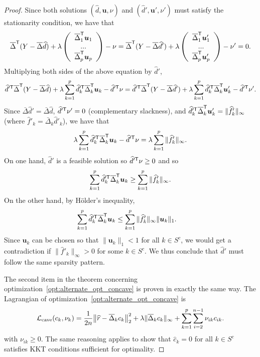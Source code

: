 \begin{proof}
Since both solutions $(\hat{d}, \mathbf{u}, \nu)$ and $(\hat{d}',
\mathbf{u}', \nu')$ must satisfy the stationarity condition, we have
that
\[
\overline{\Delta}^{\mathsf{T}} ( Y - \overline{\Delta} \widehat{d} ) 
   + \lambda \left( \begin{array}{c} 
          \overline{\Delta}_1^{\mathsf{T}} \mbox{\boldmath $u$}_1  
          \\ ... \\ \overline{\Delta}_p^{\mathsf{T}} \mbox{\boldmath $u$}_p \end{array} \right)
    - \nu = 
\overline{\Delta}^{\mathsf{T}} ( Y - \overline{\Delta} \widehat{d}' ) 
   + \lambda \left( \begin{array}{c} 
          \overline{\Delta}_1^{\mathsf{T}} \mbox{\boldmath $u$}'_1  
          \\ ... \\ \overline{\Delta}_p^{\mathsf{T}} \mbox{\boldmath $u$}'_p \end{array} \right)
 - \nu' = 0.
\] 
Multiplying both sides of the above equation by $\hat{d}'$,
\[
\widehat{d}'^{\mathsf{T}}  \overline{\Delta}^{\mathsf{T}} ( Y - \overline{\Delta} \widehat{d} ) 
    + \lambda \sum_{k=1}^p \widehat{d}'^{\mathsf{T}}_k \overline{\Delta}_k^{\mathsf{T}} \mbox{\boldmath $u$}_k - \widehat{d}'^{\mathsf{T}} \nu = \widehat{d}'^{\mathsf{T}}  \overline{\Delta}^{\mathsf{T}} ( Y - \overline{\Delta} \widehat{d}' ) 
    + \lambda \sum_{k=1}^p \widehat{d}'^{\mathsf{T}}_k \overline{\Delta}_k^{\mathsf{T}} \mbox{\boldmath $u$}'_k - \widehat{d}'^{\mathsf{T}} \nu'.
\]
Since $\bar{\Delta} \hat{d}' = \bar{\Delta} \hat{d}$, $\widehat{d}'^{\mathsf{T}} \nu' = 0$ (complementary slackness), and $\widehat{d}'^{\mathsf{T}}_k \overline{\Delta}_k^{\mathsf{T}} \mbox{\boldmath $u$}'_k  = \| \widehat{f}'_k \|_\infty$ (where $\hat{f}'_k = \bar{\Delta}_k \hat{d}'_k$), we have that
\[
\lambda \sum_{k=1}^p \widehat{d}'^{\mathsf{T}}_k \overline{\Delta}_k^{\mathsf{T}} \mbox{\boldmath $u$}_k - \widehat{d}'^{\mathsf{T}} \nu = \lambda \sum_{k=1}^p \| \widehat{f}'_k \|_\infty.
\]
On one hand, $\hat{d}'$ is a feasible solution so $\widehat{d}'^{\mathsf{T}} \nu \geq 0$ and so 
\[
\sum_{k=1}^p \widehat{d}'^{\mathsf{T}}_k \overline{\Delta}_k^{\mathsf{T}} \mbox{\boldmath $u$}_k \geq \sum_{k=1}^p \| \widehat{f}'_k \|_\infty .
\]
On the other hand, by H\"older's inequality,
\begin{align*}
\sum_{k=1}^p \widehat{d}'^{\mathsf{T}}_k \overline{\Delta}_k^{\mathsf{T}} \mbox{\boldmath $u$}_k &\leq 
   \sum_{k=1}^p \| \widehat{f}'_k \|_\infty \|\mbox{\boldmath $u$}_k \|_1 .
\end{align*}
Since $\mathbf{u}_k$ can be chosen so that $\| \mathbf{u}_k \|_1 < 1$ for all $k \in S^c$, we would get a contradiction if $\| \hat{f}'_k \|_\infty > 0$ for some $k \in S^c$. We thus conclude that $\hat{d}'$ must follow the same sparsity pattern.


The second item in the theorem concerning optimization~\ref{opt:alternate_opt_concave} is proven in exactly the same way. 
The Lagrangian of optimization~\ref{opt:alternate_opt_concave} is
\[
\mathcal{L}_{\textrm{cave}}(c_k, \nu_k) = 
  \frac{1}{2n} \big\| \widehat{r} - \overline{\Delta}_k c_k \big \|_2^2 + 
  \lambda \| \overline{\Delta}_k c_k \|_\infty + \sum_{k=1}^p \sum_{i=2}^{n-1} \nu_{ik} c_{ik}.
\]
with $\nu_{ik} \geq 0$.
The same reasoning applies to show that $\hat{c}_k = 0$ for all $k\in S^c$ satisfies KKT conditions sufficient for optimality.
\end{proof}
 
